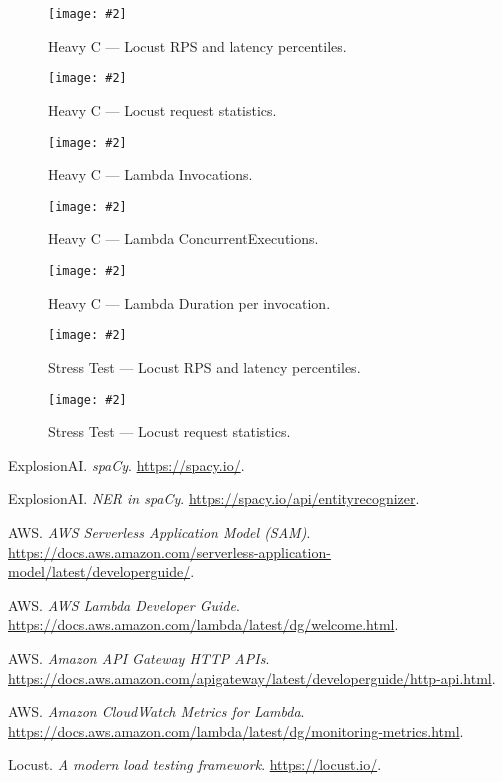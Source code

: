 \documentclass[11pt,a4paper]{article}
\newcommand{\scenariofig}[4][\linewidth]{%
  \begin{figure}[htbp]
    \centering
    \texttt{[image: \#2]}
    \caption{#3}
    \label{#4}
  \end{figure}%
}
\begin{document}
\scenariofig[0.8\textwidth]{figures/hC - Charts.png}{Heavy C — Locust RPS and latency percentiles.}{fig:hc-charts}
\scenariofig[0.9\textwidth]{figures/hC - Stats.png}{Heavy C — Locust request statistics.}{fig:hc-stats}
\scenariofig{figures/hC - Invocations.png}{Heavy C — Lambda Invocations.}{fig:hc-invocations}
\scenariofig{figures/hC - ConcEx.png}{Heavy C — Lambda ConcurrentExecutions.}{fig:hc-conc}
\scenariofig{figures/hC - Duration.png}{Heavy C — Lambda Duration per invocation.}{fig:hc-duration}

\scenariofig[0.8\textwidth]{figures/hhA - Charts.png}{Stress Test — Locust RPS and latency percentiles.}{fig:hha-charts}
\scenariofig[0.9\textwidth]{figures/hhA - Stats.png}{Stress Test — Locust request statistics.}{fig:hha-stats}

\clearpage

\begin{thebibliography}{9}
ExplosionAI. \emph{spaCy}. \url{https://spacy.io/}.

ExplosionAI. \emph{NER in spaCy}. \url{https://spacy.io/api/entityrecognizer}.

AWS. \emph{AWS Serverless Application Model (SAM)}. \url{https://docs.aws.amazon.com/serverless-application-model/latest/developerguide/}.

AWS. \emph{AWS Lambda Developer Guide}. \url{https://docs.aws.amazon.com/lambda/latest/dg/welcome.html}.

AWS. \emph{Amazon API Gateway HTTP APIs}. \url{https://docs.aws.amazon.com/apigateway/latest/developerguide/http-api.html}.

AWS. \emph{Amazon CloudWatch Metrics for Lambda}. \url{https://docs.aws.amazon.com/lambda/latest/dg/monitoring-metrics.html}.

Locust. \emph{A modern load testing framework}. \url{https://locust.io/}.
\end{thebibliography}
\end{document}

